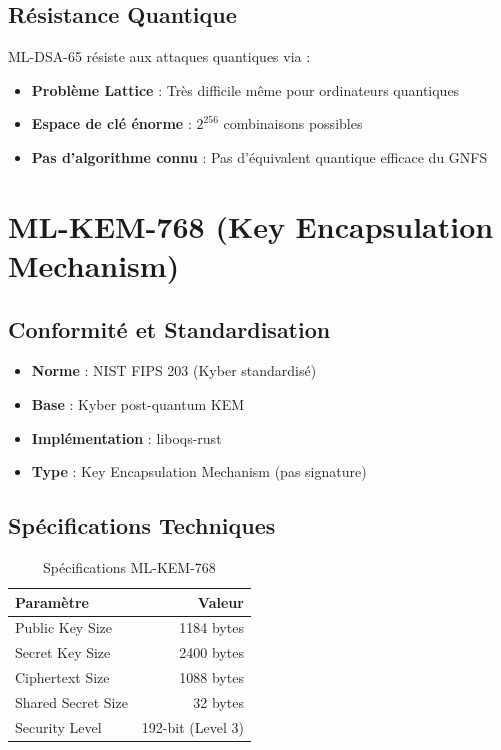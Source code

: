 \documentclass[12pt,a4paper]{report}
\begin{document}
\subsection{Résistance Quantique}

ML-DSA-65 résiste aux attaques quantiques via :
\begin{itemize}
  \item \textbf{Problème Lattice} : Très difficile même pour ordinateurs quantiques
  \item \textbf{Espace de clé énorme} : $2^{256}$ combinaisons possibles
  \item \textbf{Pas d'algorithme connu} : Pas d'équivalent quantique efficace du GNFS
\end{itemize}

\section{ML-KEM-768 (Key Encapsulation Mechanism)}

\subsection{Conformité et Standardisation}

\begin{itemize}
  \item \textbf{Norme} : NIST FIPS 203 (Kyber standardisé)
  \item \textbf{Base} : Kyber post-quantum KEM
  \item \textbf{Implémentation} : liboqs-rust
  \item \textbf{Type} : Key Encapsulation Mechanism (pas signature)
\end{itemize}

\subsection{Spécifications Techniques}

\begin{table}[H]
\centering
\begin{tabular}{|l|r|}
\hline
\textbf{Paramètre} & \textbf{Valeur} \\
\hline
Public Key Size & 1184 bytes \\
\hline
Secret Key Size & 2400 bytes \\
\hline
Ciphertext Size & 1088 bytes \\
\hline
Shared Secret Size & 32 bytes \\
\hline
Security Level & 192-bit (Level 3) \\
\hline
\end{tabular}
\caption{Spécifications ML-KEM-768}
\end{table}
\end{document}
